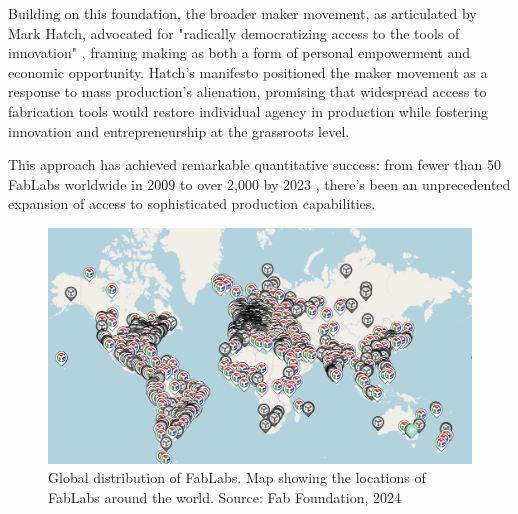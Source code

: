 Building on this foundation, the broader maker movement, as articulated by Mark Hatch, advocated for "radically democratizing access to the tools of innovation" \citep{hatch2013}, framing making as both a form of personal empowerment and economic opportunity. Hatch's manifesto positioned the maker movement as a response to mass production's alienation, promising that widespread access to fabrication tools would restore individual agency in production while fostering innovation and entrepreneurship at the grassroots level.

\vspace{0.5cm}

This approach has achieved remarkable quantitative success: from fewer than 50 FabLabs worldwide in 2009 to over 2,000 by 2023 \citep{fabfoundation2024}, there's been an unprecedented expansion of access to sophisticated production capabilities.

\vspace{0.5cm}


\begin{figure}[h]
\centering
\includegraphics[width=1\textwidth]{figures/chapter2/fablabsmap.png}
\caption{Global distribution of FabLabs. Map showing the locations of FabLabs around the world. Source: Fab Foundation, 2024}
\label{fig:fablabs_map}
\end{figure}

